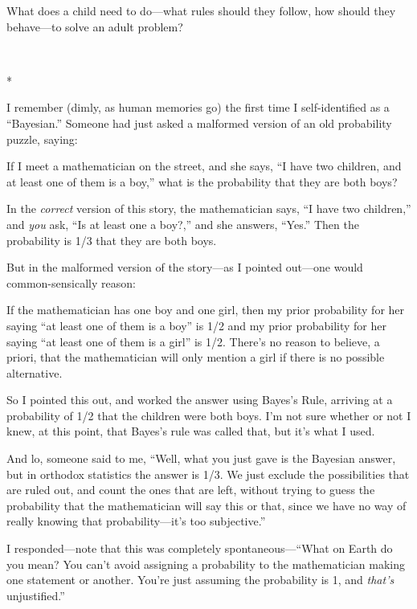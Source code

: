 {
 What does a child need to do---what rules should they follow, how
should they behave---to solve an adult problem?}

{\centering
 \ ~
\par}

{\centering
 *
\par}


{
 I remember (dimly, as human memories go) the first time I
self-identified as a ``Bayesian.''
Someone had just asked a malformed version of an old probability
puzzle, saying:}

{
 If I meet a mathematician on the street, and she says,
``I have two children, and at least one of them is a
boy,'' what is the probability that they are both
boys?}

{
 In the \textit{correct} version of this story, the mathematician
says, ``I have two children,'' and
\textit{you} ask, ``Is at least one a
boy?,'' and she answers,
``Yes.'' Then the probability is 1/3
that they are both boys.}

{
 But in the malformed version of the story---as I pointed out---one
would common-sensically reason:}

{
 If the mathematician has one boy and one girl, then my prior
probability for her saying ``at least one of them is a
boy'' is 1/2 and my prior probability for her saying
``at least one of them is a girl''
is 1/2. There's no reason to believe, a priori, that
the mathematician will only mention a girl if there is no possible
alternative.}

{
 So I pointed this out, and worked the answer using
Bayes's Rule, arriving at a probability of 1/2 that the
children were both boys. I'm not sure whether or not I
knew, at this point, that Bayes's rule was called that,
but it's what I used.}

{
 And lo, someone said to me, ``Well, what you just
gave is the Bayesian answer, but in orthodox statistics the answer is
1/3. We just exclude the possibilities that are ruled out, and count
the ones that are left, without trying to guess the probability that
the mathematician will say this or that, since we have no way of really
knowing that probability---it's too
subjective.''}

{
 I responded---note that this was completely
spontaneous---``What on Earth do you mean? You
can't avoid assigning a probability to the
mathematician making one statement or another. You're
just assuming the probability is 1, and \textit{that's}
unjustified.''}

